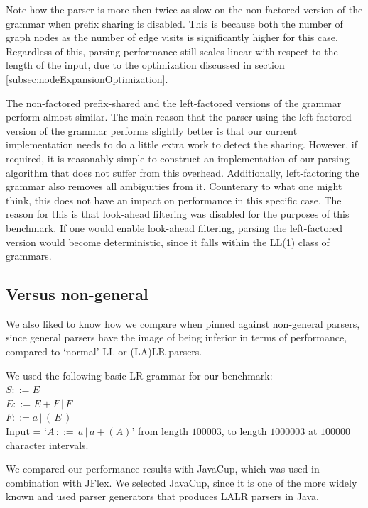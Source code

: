 \documentclass[a4paper,10pt]{article}
\begin{document}
Note how the parser is more then twice as slow on the non-factored version of the grammar when prefix sharing is disabled. This is because both the number of graph nodes as the number of edge visits is significantly higher for this case. Regardless of this, parsing performance still scales linear with respect to the length of the input, due to the optimization discussed in section \ref{subsec:nodeExpansionOptimization}.

The non-factored prefix-shared and the left-factored versions of the grammar perform almost similar. The main reason that the parser using the left-factored version of the grammar performs slightly better is that our current implementation needs to do a little extra work to detect the sharing. However, if required, it is reasonably simple to construct an implementation of our parsing algorithm that does not suffer from this overhead. Additionally, left-factoring the grammar also removes all ambiguities from it. Counterary to what one might think, this does not have an impact on performance in this specific case. The reason for this is that look-ahead filtering was disabled for the purposes of this benchmark. If one would enable look-ahead filtering, parsing the left-factored version would become deterministic, since it falls within the LL(1) class of grammars.

\subsection{Versus non-general}

We also liked to know how we compare when pinned against non-general parsers, since general parsers have the image of being inferior in terms of performance, compared to `normal' LL or (LA)LR parsers.

We used the following basic LR grammar for our benchmark:\\
$S ::= E$\\
$E ::= E + F\,|\,F$\\
$F ::= a\,|\,(\,E\,)$\\
Input = `$A\,::=\,a\,|\,a+(A)$' from length $100003$, to length $1000003$ at $100000$ character intervals.

We compared our performance results with JavaCup, which was used in combination with JFlex. We selected JavaCup, since it is one of the more widely known and used parser generators that produces LALR parsers in Java.
\end{document}
